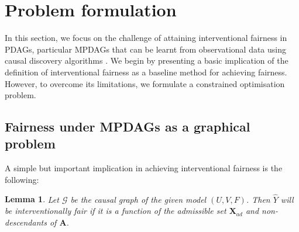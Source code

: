 \documentclass{article} %
\newtheorem{lemma}{Lemma}[section]
\begin{document}







\section{Problem formulation}
In this section, we focus on the challenge of attaining interventional fairness in PDAGs, particular MPDAGs that can be learnt from observational data using causal discovery algorithms \citep{spirtes1991algorithm,colombo2014order,chickering2002learning}. 
We begin by presenting a basic implication of the definition of interventional fairness as a baseline method for achieving fairness. However, to overcome its limitations, we formulate a constrained optimisation problem.

\subsection{Fairness under MPDAGs as a graphical problem} \label{sec: IFair}
A simple but important implication in achieving interventional fairness is the following:

\begin{lemma}\label{lem: interventional fairness implication}
    Let $\mathcal{G}$ be the causal graph of the given model $(U,V,F)$. Then $\hat{Y}$ will be interventionally fair if it is a function of the admissible set $\mathbf{X}_{ad}$ and non-descendants of $\mathbf{A}$.
\end{lemma}
\end{document}
